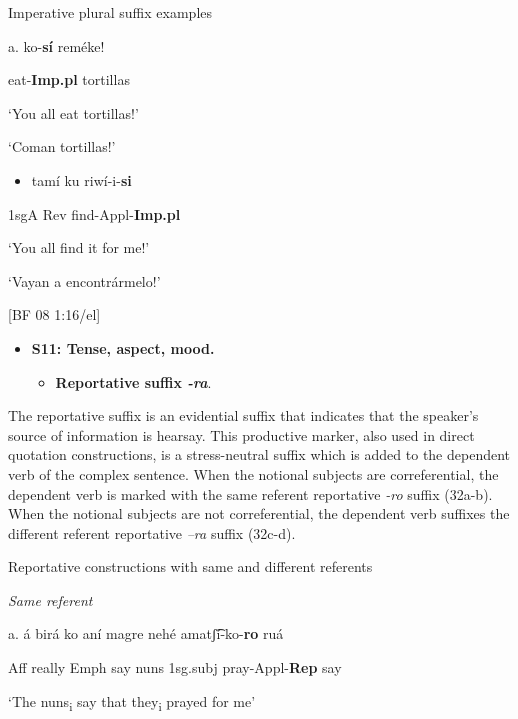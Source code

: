    Imperative plural suffix examples

  a.  ko-\textbf{sí}    reméke!

    eat-\textbf{Imp.pl}  tortillas

    ‘You all eat tortillas!’

    ‘Coman tortillas!’          


\begin{itemize}
\item 
tamí  ku  riwí-i-\textbf{si}
\end{itemize}

1sgA  Rev  find-Appl-\textbf{Imp.pl}



  ‘You all find it for me!’



  ‘Vayan a encontrármelo!’        



  [BF 08 1:16/el]



\begin{itemize}
\item \textbf{S11: Tense, aspect, mood.}

\begin{itemize}
\item \textbf{Reportative suffix \textit{{}-ra}}.
\end{itemize}
\end{itemize}

The reportative suffix is an evidential suffix that indicates that the speaker’s source of information is hearsay. This productive marker, also used in direct quotation constructions, is a stress-neutral suffix which is added to the dependent verb of the complex sentence. When the notional subjects are correferential, the dependent verb is marked with the same referent reportative \textit{{}-ro} suffix (32a-b). When the notional subjects are not correferential, the dependent verb suffixes the different referent reportative \textit{–ra} suffix (32c-d).

  Reportative constructions with same and different referents

  \textit{Same referent}

a.        á    birá   ko        aní      magre  nehé  amatʃ͡í-ko-\textbf{ro}    ruá

Aff   really   Emph  say  nuns  1sg.subj  pray-Appl-\textbf{Rep} say

‘The nuns\textsubscript{i} say that they\textsubscript{i} prayed for me’

